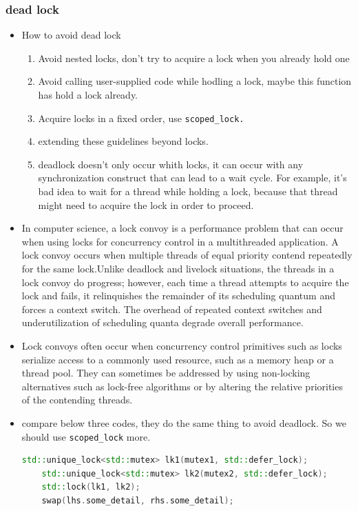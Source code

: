\documentclass[a4paper,11pt,twoside]{book}
\begin{document}
\subsubsection{dead lock}

\begin{itemize}
	
	\item How to avoid dead lock
	\begin{enumerate}
		\item Avoid nested locks, don't try to acquire a lock when you already hold one
		\item Avoid calling user-supplied code while hodling a lock, maybe this function has hold a lock already.
		\item Acquire locks in a fixed order, use \texttt{scoped\_lock.}
		\item extending these guidelines beyond locks. 
		\item deadlock doesn't only occur whith locks, it can occur with any synchronization construct that can lead to a wait cycle. For example, it's bad idea to wait for a thread while holding a lock, because that thread might need to acquire the lock in order to proceed. 
	\end{enumerate}	
	
	\item In computer science, a lock convoy is a performance problem that can occur when using locks for concurrency control in a multithreaded application.  A lock convoy occurs when multiple threads of equal priority contend repeatedly for the same lock.Unlike deadlock and livelock situations, the threads in a lock convoy do progress; however, each time a thread attempts to acquire the lock and fails, it relinquishes the remainder of its scheduling quantum and forces a context switch. The overhead of repeated context switches and underutilization of scheduling quanta degrade overall performance.
	
	\item Lock convoys often occur when concurrency control primitives such as locks serialize access to a commonly used resource, such as a memory heap or a thread pool. They can sometimes be addressed by using non-locking alternatives such as lock-free algorithms or by altering the relative priorities of the contending threads.
	
	\item compare below three codes, they do the same thing to avoid deadlock. So we should use \texttt{scoped\_lock} more. 
\begin{lstlisting}[frame=single, language=c++]
	std::unique_lock<std::mutex> lk1(mutex1, std::defer_lock);
	std::unique_lock<std::mutex> lk2(mutex2, std::defer_lock);
	std::lock(lk1, lk2);	
	swap(lhs.some_detail, rhs.some_detail);
\end{lstlisting}


\end{itemize}
\end{document}
